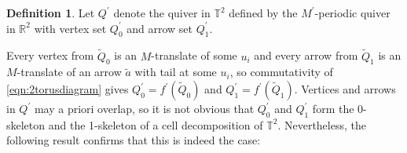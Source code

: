 \documentclass[11pt,a4paper]{amsart}
\numberwithin{equation}{section}
\theoremstyle{definition}
\newtheorem{definition}[theorem]{Definition}
\theoremstyle{remark}
\newcommand{\RR}{\ensuremath{\mathbb{R}}}
\begin{document}
\begin{definition}
Let $Q^\prime$ denote the quiver in $\mathbb{T}^2$ defined by the $M^\prime$-periodic quiver in $\RR^2$ with vertex set $Q^\prime_0$ and arrow set $Q^\prime_1$.
\end{definition}

Every vertex from $\widetilde{Q}_0$ is an $M$-translate of some $u_i$ and every arrow from $\widetilde{Q}_1$ is an $M$-translate of an arrow $\widetilde{a}$ with tail at some $u_i$,  so commutativity of \eqref{eqn:2torusdiagram} gives $Q^\prime_0 = f^\prime(\widetilde{Q}_0)$ and $Q^\prime_1 = f^\prime(\widetilde{Q}_1)$. Vertices and arrows in $Q^\prime$ may a priori overlap, so it is not obvious that $Q_0^\prime$ and $Q_1^\prime$ form the 0-skeleton and the 1-skeleton of a cell decomposition of $\mathbb{T}^2$. Nevertheless, the following result confirms that this is indeed the case:
\end{document}
